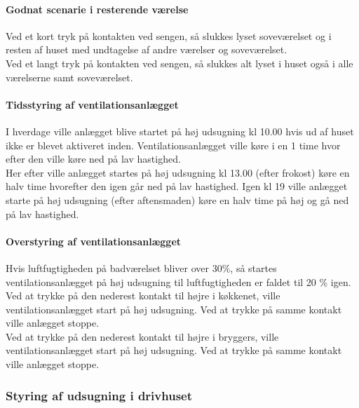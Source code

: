 \paragraph{Godnat scenarie i resterende værelse}
Ved et kort tryk på kontakten ved sengen, 
så slukkes lyset soveværelset og i resten af huset med undtagelse af andre værelser og soveværelset. \\
Ved et langt tryk på kontakten ved sengen, 
så slukkes alt lyset i huset også i alle værelserne samt soveværelset.

\paragraph{Tidsstyring af ventilationsanlægget}
I hverdage ville anlægget blive startet på høj udsugning kl 10.00 hvis ud af huset ikke er blevet aktiveret inden. 
Ventilationsanlægget ville køre i en 1 time hvor efter den ville køre ned på lav hastighed. \\
Her efter ville anlægget startes på høj udsugning kl 13.00 (efter frokost) køre en halv time hvorefter den igen går ned på lav hastighed.
Igen kl 19 ville anlægget starte på høj udsugning (efter aftensmaden) køre en halv time på høj og gå ned på lav hastighed.

\paragraph{Overstyring af ventilationsanlægget}
Hvis luftfugtigheden på badværelset bliver over 30\%, så startes ventilationsanlægget på høj udsugning til luftfugtigheden er faldet til 20 \% igen. \\
Ved at trykke på den nederest kontakt til højre i køkkenet, ville ventilationsanlægget start på høj udsugning. Ved at trykke på samme kontakt ville anlægget stoppe. \\
Ved at trykke på den nederest kontakt til højre i bryggers, ville ventilationsanlægget start på høj udsugning. Ved at trykke på samme kontakt ville anlægget stoppe.

\subsubsection{Styring af udsugning i drivhuset} \label{subsub:ihc_drivhus}

